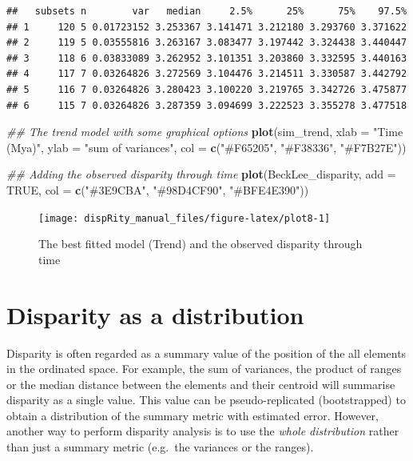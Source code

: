 \documentclass[
]{book}
\newenvironment{Shaded}{\begin{snugshade}}{\end{snugshade}}
\newcommand{\CommentTok}[1]{\textcolor[rgb]{0.56,0.35,0.01}{\textit{#1}}}
\newcommand{\DataTypeTok}[1]{\textcolor[rgb]{0.13,0.29,0.53}{#1}}
\newcommand{\KeywordTok}[1]{\textcolor[rgb]{0.13,0.29,0.53}{\textbf{#1}}}
\newcommand{\NormalTok}[1]{#1}
\newcommand{\OtherTok}[1]{\textcolor[rgb]{0.56,0.35,0.01}{#1}}
\newcommand{\StringTok}[1]{\textcolor[rgb]{0.31,0.60,0.02}{#1}}
\begin{document}
\begin{verbatim}
##   subsets n        var   median     2.5%      25%      75%    97.5%
## 1     120 5 0.01723152 3.253367 3.141471 3.212180 3.293760 3.371622
## 2     119 5 0.03555816 3.263167 3.083477 3.197442 3.324438 3.440447
## 3     118 6 0.03833089 3.262952 3.101351 3.203860 3.332595 3.440163
## 4     117 7 0.03264826 3.272569 3.104476 3.214511 3.330587 3.442792
## 5     116 7 0.03264826 3.280423 3.100220 3.219765 3.342726 3.475877
## 6     115 7 0.03264826 3.287359 3.094699 3.222523 3.355278 3.477518
\end{verbatim}

\begin{Shaded}
\begin{Highlighting}[]
\CommentTok{\#\# The trend model with some graphical options}
\KeywordTok{plot}\NormalTok{(sim\_trend, }\DataTypeTok{xlab =} \StringTok{"Time (Mya)"}\NormalTok{, }\DataTypeTok{ylab =} \StringTok{"sum of variances"}\NormalTok{,}
    \DataTypeTok{col =} \KeywordTok{c}\NormalTok{(}\StringTok{"\#F65205"}\NormalTok{, }\StringTok{"\#F38336"}\NormalTok{, }\StringTok{"\#F7B27E"}\NormalTok{))}

\CommentTok{\#\# Adding the observed disparity through time}
\KeywordTok{plot}\NormalTok{(BeckLee\_disparity, }\DataTypeTok{add =} \OtherTok{TRUE}\NormalTok{, }\DataTypeTok{col =} \KeywordTok{c}\NormalTok{(}\StringTok{"\#3E9CBA"}\NormalTok{, }\StringTok{"\#98D4CF90"}\NormalTok{, }\StringTok{"\#BFE4E390"}\NormalTok{))}
\end{Highlighting}
\end{Shaded}

\begin{figure}

{\centering \texttt{[image: dispRity\_manual\_files/figure-latex/plot8-1]} 

}

\caption{The best fitted model (Trend) and the observed disparity through time}\label{fig:plot8}
\end{figure}

\hypertarget{disparity-distribution}{%
\section{Disparity as a distribution}\label{disparity-distribution}}

Disparity is often regarded as a summary value of the position of the all elements in the ordinated space.
For example, the sum of variances, the product of ranges or the median distance between the elements and their centroid will summarise disparity as a single value.
This value can be pseudo-replicated (bootstrapped) to obtain a distribution of the summary metric with estimated error.
However, another way to perform disparity analysis is to use the \emph{whole distribution} rather than just a summary metric (e.g.~the variances or the ranges).
\end{document}

